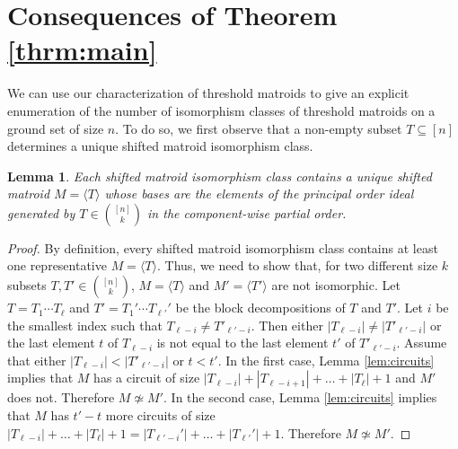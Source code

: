 \documentclass[10pt,a4paper]{amsart}
\theoremstyle{definition}
\theoremstyle{plain}
\newtheorem{lemma}[defn]{Lemma}
\begin{document}
\section{Consequences of Theorem \ref{thrm:main}}
\label{sec:consequences}

We can use our characterization of threshold matroids to give an explicit enumeration of the number of isomorphism classes of threshold matroids on a ground set of size $n$. To do so, we first observe that a non-empty subset $T\subseteq [n]$ determines a unique shifted matroid isomorphism class.

\begin{lemma}
  \label{lem:iso}
Each shifted matroid isomorphism class contains a unique shifted matroid $M=\langle T \rangle$ whose bases are the elements of the principal order ideal generated by $T\in \binom{[n]}{k}$ in the component-wise partial order.
\end{lemma}
\begin{proof}
  By definition, every shifted matroid isomorphism class contains at least one representative $M=\langle T \rangle$. Thus, we need to show that, for two different size $k$ subsets $T,T'\in \binom{[n]}{k}$, $M=\langle T\rangle $ and $M'=\langle T'\rangle$ are not isomorphic. Let $T=T_1\cdots T_\ell$ and $T'=T_1'\cdots T_{\ell'}'$ be the block decompositions of $T$ and $T'$. Let $i$ be the smallest index such that $T_{\ell-i}\neq T'_{\ell'-i}$. Then either $|T_{\ell-i}|\neq |T'_{\ell'-i}|$ or the last element $t$ of $T_{\ell-i}$ is not equal to the last element $t'$ of $T'_{\ell'-i}$. Assume that either $|T_{\ell-i}|< |T'_{\ell'-i}|$ or $t<t'$. In the first case, Lemma \ref{lem:circuits} implies that $M$ has a circuit of size $|T_{\ell-i}|+|T_{\ell-i+1}|+\ldots+ |T_{\ell}|+1$ and $M'$ does not. Therefore $M\not\simeq M'$. In the second case, Lemma \ref{lem:circuits} implies that $M$ has $t'-t$ more circuits of size $|T_{\ell-i}|+\ldots + |T_\ell|+1 = |T_{\ell'-i}'|+\ldots + |T_{\ell'}'|+1$. Therefore $M\not\simeq M'$.
\end{proof}
\end{document}
